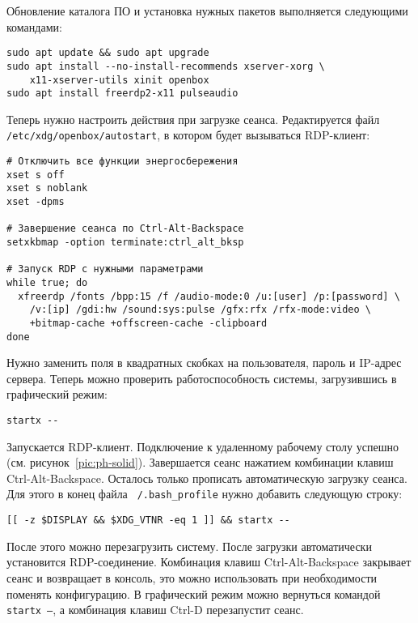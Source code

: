 Обновление каталога ПО и установка нужных пакетов выполняется следующими командами:
\begin{verbatim}
sudo apt update && sudo apt upgrade
sudo apt install --no-install-recommends xserver-xorg \
    x11-xserver-utils xinit openbox
sudo apt install freerdp2-x11 pulseaudio
\end{verbatim}

Теперь нужно настроить действия при загрузке сеанса. Редактируется файл
\texttt{/etc/xdg/openbox/autostart}, в котором будет вызываться RDP-клиент:
\begin{verbatim}
# Отключить все функции энергосбережения
xset s off
xset s noblank
xset -dpms

# Завершение сеанса по Ctrl-Alt-Backspace
setxkbmap -option terminate:ctrl_alt_bksp

# Запуск RDP с нужными параметрами
while true; do
  xfreerdp /fonts /bpp:15 /f /audio-mode:0 /u:[user] /p:[password] \
    /v:[ip] /gdi:hw /sound:sys:pulse /gfx:rfx /rfx-mode:video \
    +bitmap-cache +offscreen-cache -clipboard
done
\end{verbatim}

Нужно заменить поля в квадратных скобках на пользователя, пароль и IP-адрес сервера.
Теперь можно проверить работоспособность системы, загрузившись в графический режим:
\begin{verbatim}
startx --
\end{verbatim}

Запускается RDP-клиент. Подключение к удаленному рабочему столу успешно (см.
рисунок~\ref{pic:ph-solid}). Завершается
сеанс нажатием комбинации клавиш Ctrl-Alt-Backspace. Осталось только прописать
автоматическую загрузку сеанса. Для этого в конец файла \texttt{~/.bash\_profile} нужно
добавить следующую строку:
\begin{verbatim}
[[ -z $DISPLAY && $XDG_VTNR -eq 1 ]] && startx --
\end{verbatim}

После этого можно перезагрузить систему. После загрузки автоматически установится
RDP-соединение. Комбинация клавиш Ctrl-Alt-Backspace закрывает сеанс и возвращает в
консоль, это можно использовать при необходимости поменять конфигурацию. В графический
режим можно вернуться командой \texttt{startx --}, а комбинация клавиш Ctrl-D
перезапустит сеанс.

